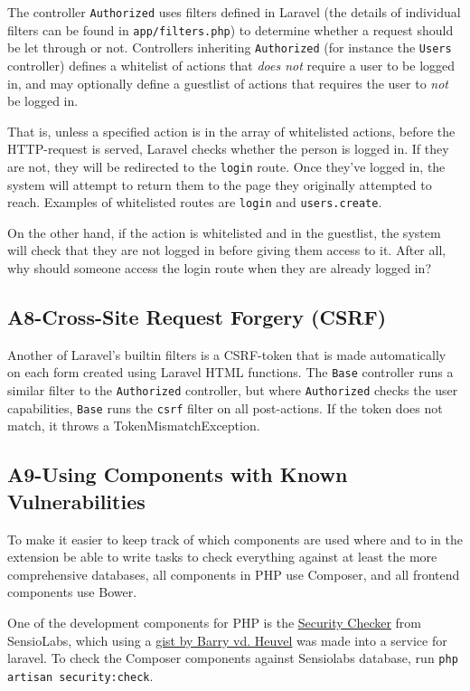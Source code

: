 The controller \texttt{Authorized} uses filters defined in Laravel (the
details of individual filters can be found in \texttt{app/filters.php})
to determine whether a request should be let through or not. Controllers
inheriting \texttt{Authorized} (for instance the \texttt{Users}
controller) defines a whitelist of actions that \emph{does not} require
a user to be logged in, and may optionally define a guestlist of actions
that requires the user to \emph{not} be logged in.

That is, unless a specified action is in the array of whitelisted
actions, before the HTTP-request is served, Laravel checks whether the
person is logged in. If they are not, they will be redirected to the
\texttt{login} route. Once they've logged in, the system will attempt to
return them to the page they originally attempted to reach. Examples of
whitelisted routes are \texttt{login} and \texttt{users.create}.

On the other hand, if the action is whitelisted and in the guestlist,
the system will check that they are not logged in before giving them
access to it. After all, why should someone access the login route when
they are already logged in?

\subsection{A8-Cross-Site Request Forgery (CSRF)}

Another of Laravel's builtin filters is a CSRF-token that is made
automatically on each form created using Laravel HTML functions. The
\texttt{Base} controller runs a similar filter to the
\texttt{Authorized} controller, but where \texttt{Authorized} checks the
user capabilities, \texttt{Base} runs the \texttt{csrf} filter on all
post-actions. If the token does not match, it throws a
TokenMismatchException.

\subsection{A9-Using Components with Known Vulnerabilities}

To make it easier to keep track of which components are used where and
to in the extension be able to write tasks to check everything against
at least the more comprehensive databases, all components in PHP use
Composer, and all frontend components use Bower.

One of the development components for PHP is the
\href{https://packagist.org/packages/sensiolabs/security-checker}{Security
Checker} from SensioLabs, which using a
\href{https://gist.github.com/barryvdh/6696739}{gist by Barry vd.
Heuvel} was made into a service for laravel. To check the Composer
components against Sensiolabs database, run
\texttt{php artisan security:check}.

